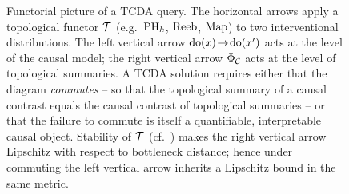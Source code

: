 \begin{figure}[t]
\centering
{}
\caption{Functorial picture of a TCDA query. The horizontal arrows apply
a topological functor $\mathcal{T}$ (e.g.\ $\mathrm{PH}_{k}$, $\mathrm{Reeb}$, $\mathrm{Map}$) to two
interventional distributions. The left vertical arrow $\mathrm{do}(x)\!\to\!\mathrm{do}(x')$
acts at the level of the causal model; the right vertical arrow $\Phi_{\mathcal{C}}$
acts at the level of topological summaries. A TCDA solution requires either
that the diagram \emph{commutes} -- so that the topological summary of a
causal contrast equals the causal contrast of topological summaries -- or
that the failure to commute is itself a quantifiable, interpretable causal
object. Stability of $\mathcal{T}$ (cf.\ ) makes the right
vertical arrow Lipschitz with respect to bottleneck distance; hence under
commuting the left vertical arrow inherits a Lipschitz bound in the same
metric.}
\label{fig:functorial}
\end{figure}
